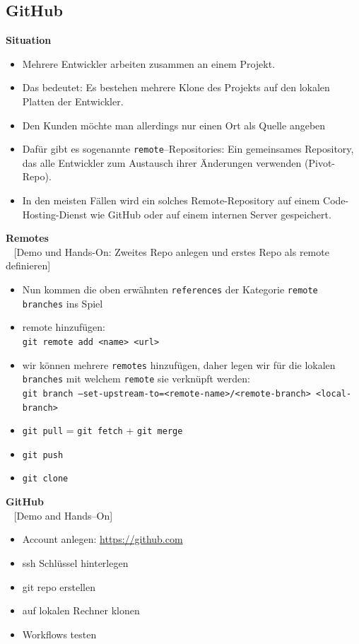 \subsection{GitHub}
\textbf{Situation}
\begin{itemize}
	\item Mehrere Entwickler arbeiten zusammen an einem Projekt.
	\item Das bedeutet: Es bestehen mehrere Klone des Projekts auf den lokalen Platten der Entwickler.
	\item Den Kunden möchte man allerdings nur einen Ort als Quelle angeben
	\item Dafür gibt es sogenannte \texttt{remote}--Repositories: Ein gemeinsames Repository, das alle Entwickler zum Austausch ihrer Änderungen verwenden (Pivot-Repo). 
	\item In den meisten Fällen wird ein solches Remote-Repository auf einem Code-Hosting-Dienst wie GitHub oder auf einem internen Server gespeichert.
\end{itemize}
%
\textbf{Remotes}\\~
[Demo und Hands-On: Zweites Repo anlegen und erstes Repo als remote definieren]
\begin{itemize}
	\item Nun kommen die oben erwähnten \texttt{references} der Kategorie \texttt{remote branches} ins Spiel
	\item remote hinzufügen:\\
	\texttt{git remote add <name> <url>}
	\item wir können mehrere \texttt{remotes} hinzufügen, daher legen wir für die lokalen \texttt{branches} mit welchem \texttt{remote} sie verknüpft werden:\\
	\texttt{git branch --set-upstream-to=<remote-name>/<remote-branch> <local-branch>}
	\item \texttt{git pull} = \texttt{git fetch} + \texttt{git merge}
	\item \texttt{git push}
	\item \texttt{git clone}
\end{itemize}
%
\textbf{GitHub}\\~
[Demo and Hands--On]
\begin{itemize}
	\item Account anlegen: \url{https://github.com}
	\item ssh Schlüssel hinterlegen
	\item git repo erstellen
	\item auf lokalen Rechner klonen
	\item Workflows testen
\end{itemize}

